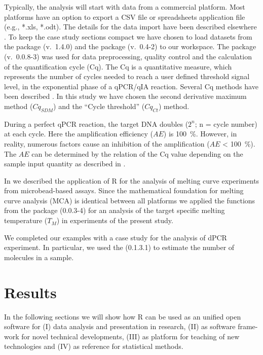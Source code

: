 Typically, the analysis will start with data from a commercial platform. 
Most platforms have an option to export a CSV file or spreadsheets application 
file (e.g., *.xls, *.odt). The details for the data import have been described 
elsewhere \citep{RDCT2010c, rodiger_rkward_2012}. To keep the case study 
sections compact we have chosen to load datasets from the  package 
\citep{ritz_2008, spiess_2008} (v.~1.4.0) and the  package 
(v.~0.4-2) to our workspace. The  package (v.~0.0.8-3) was used 
for data preprocessing, quality control and  the calculation of the 
quantification cycle (Cq). The Cq is a quantitative measure, which represents 
the number of cycles needed to reach a user defined threshold signal level, in 
the exponential phase of a qPCR/qIA reaction. Several Cq methods have been 
described \citep{ruijter_2013}. In this study we have chosen the second 
derivative maximum method ($Cq_{SDM}$) and the ``Cycle threshold'' ($Cq_{Ct}$) 
method.

During a perfect qPCR reaction, the target DNA doubles ($2^{n}$; n = cycle 
number) at each cycle. Here the amplification efficiency ($AE$) is 100~\%. 
However, in reality, numerous factors cause an inhibition of the amplification 
($AE$ < 100~\%). The $AE$ can be determined by the relation of the Cq value 
depending on the sample input quantity as described in 
\citet{roediger_chippcr_2014}.

In \citet{roediger_RJ_2013} we described the application of R for the analysis 
of melting curve experiments from microbead-based assays. Since the mathematical 
foundation for melting curve analysis (MCA) is identical between all platforms 
we applied the functions from the  package (0.0.3-4) for an 
analysis of the target specific melting temperature ($T_{M}$) in experiments of 
the present study.

We completed our examples with a case study for the analysis of dPCR 
experiment. In particular, we used the  (0.1.3.1) to estimate the 
number of molecules in a sample.

\section{Results}

In the following sections we will show how R can be used as an unified open 
software for (I) data analysis and presentation in research, 
(II) as software frame-work for novel technical developments, (III) as platform 
for teaching of new technologies and (IV) as reference for statistical methods.

